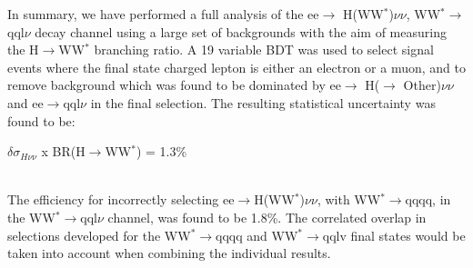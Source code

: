 In summary, we have performed a full analysis of the ee$\rightarrow$ H(WW$^*$)$\nu\nu$, WW$^*\rightarrow$qql$\nu$ decay channel using a large set of backgrounds with the aim of measuring the H$\rightarrow$WW$^*$ branching ratio. A 19 variable BDT was used to select signal events where the final state charged lepton is either an electron or a muon, and to remove background which was found to be dominated by ee$\rightarrow$ H($\rightarrow$ Other)$\nu\nu$  and ee$\rightarrow$qql$\nu$ in the final selection. The resulting statistical uncertainty was found to be: \\[10pt]\centerline{\large{$\delta\sigma_{H\nu\nu}$ x BR(H$\rightarrow$WW$^*$) = 1.3\%}} \\[10pt] The efficiency for incorrectly selecting ee$\rightarrow$H(WW$^*$)$\nu\nu$, with WW$^*\rightarrow$qqqq, in the WW$^*\rightarrow$qql$\nu$ channel, was found to be 1.8\%. The correlated overlap in selections developed for the WW$^*\rightarrow$qqqq and WW$^*\rightarrow$qqlv final states would be taken into account when combining the individual results.
  


